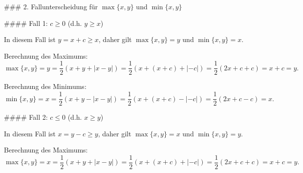\documentclass[11pt]{article}
\begin{document}
### 2. Fallunterscheidung für \( \max\{x, y\} \) und \( \min\{x, y\} \)

#### Fall 1: \( c \geq 0 \) (d.h. \( y \geq x \))

In diesem Fall ist \( y = x + c \geq x \), daher gilt \( \max\{x, y\} = y \) und \( \min\{x, y\} = x \).

Berechnung des Maximums:
\[
\max\{x, y\} = y = \frac{1}{2} (x + y + |x - y|) = \frac{1}{2} (x + (x + c) + | - c |) = \frac{1}{2} (2x + c + c) = x + c = y.
\]

Berechnung des Minimums:
\[
\min\{x, y\} = x = \frac{1}{2} (x + y - |x - y|) = \frac{1}{2} (x + (x + c) - | - c |) = \frac{1}{2} (2x + c - c) = x.
\]

#### Fall 2: \( c \leq 0 \) (d.h. \( x \geq y \))

In diesem Fall ist \( x = y - c \geq y \), daher gilt \( \max\{x, y\} = x \) und \( \min\{x, y\} = y \).

Berechnung des Maximums:
\[
\max\{x, y\} = x = \frac{1}{2} (x + y + |x - y|) = \frac{1}{2} (x + (x + c) + | - c |) = \frac{1}{2} (2x + c + c) = x + c = y.
\]
\end{document}
